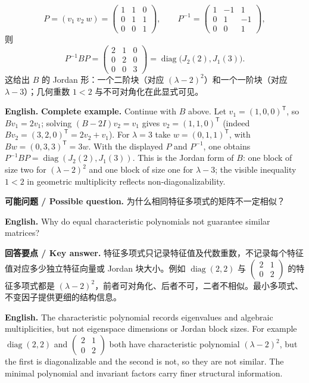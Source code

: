 \documentclass[UTF8,11pt,a4paper]{ctexart}
\newcommand{\EN}[1]{\par\noindent\textbf{English.} #1\par}
\newcommand{\ASK}[4]{\par\noindent\textbf{可能问题 / Possible question.} #1\par\EN{#2}\noindent\textbf{回答要点 / Key answer.} #3\par\EN{#4}\medskip}
\begin{document}
\[
P=(v_1\ v_2\ w)=\begin{pmatrix}1&1&0\\0&1&1\\0&0&1\end{pmatrix},\qquad
P^{-1}=\begin{pmatrix}1&-1&1\\0&1&-1\\0&0&1\end{pmatrix},
\]
则
\[
P^{-1}BP=\begin{pmatrix}2&1&0\\0&2&0\\0&0&3\end{pmatrix}
=\operatorname{diag}\bigl(J_2(2),J_1(3)\bigr).
\]
这给出 $B$ 的 Jordan 形：一个二阶块（对应 $(\lambda-2)^2$）和一个一阶块（对应 $\lambda-3$）；几何重数 $1<2$ 与不可对角化在此显式可见。
\EN{\textbf{Complete example.} Continue with $B$ above. Let $v_1=(1,0,0)^{\mathsf T}$, so $Bv_1=2v_1$; solving $(B-2I)v_2=v_1$ gives $v_2=(1,1,0)^{\mathsf T}$ (indeed $Bv_2=(3,2,0)^{\mathsf T}=2v_2+v_1$). For $\lambda=3$ take $w=(0,1,1)^{\mathsf T}$, with $Bw=(0,3,3)^{\mathsf T}=3w$. With the displayed $P$ and $P^{-1}$, one obtains $P^{-1}BP=\operatorname{diag}(J_2(2),J_1(3))$. This is the Jordan form of $B$: one block of size two for $(\lambda-2)^2$ and one block of size one for $\lambda-3$; the visible inequality $1<2$ in geometric multiplicity reflects non-diagonalizability.}
\ASK{为什么相同特征多项式的矩阵不一定相似？}{Why do equal characteristic polynomials not guarantee similar matrices?}{特征多项式只记录特征值及代数重数，不记录每个特征值对应多少独立特征向量或 Jordan 块大小。例如 $\operatorname{diag}(2,2)$ 与 $\left(\begin{smallmatrix}2&1\\0&2\end{smallmatrix}\right)$ 的特征多项式都是 $(\lambda-2)^2$，前者可对角化、后者不可，二者不相似。最小多项式、不变因子提供更细的结构信息。}{The characteristic polynomial records eigenvalues and algebraic multiplicities, but not eigenspace dimensions or Jordan block sizes. For example $\operatorname{diag}(2,2)$ and $\left(\begin{smallmatrix}2&1\\0&2\end{smallmatrix}\right)$ both have characteristic polynomial $(\lambda-2)^2$, but the first is diagonalizable and the second is not, so they are not similar. The minimal polynomial and invariant factors carry finer structural information.}
\end{document}
